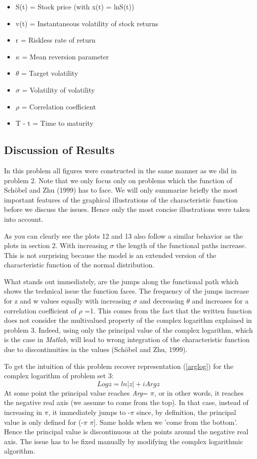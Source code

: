 \documentclass[a4paper,11pt]{article}
\begin{document}
\begin{itemize}
\item S(t) = Stock price (with x(t) = lnS(t))
\item v(t) = Instantaneous volatility of stock returns
\item r = Riskless rate of return
\item $\kappa$ =  Mean reversion parameter
\item $\theta$ = Target volatility
\item $\sigma$ = Volatility of volatility
\item $\rho$ = Correlation coefficient
\item T - t = Time to maturity
\end{itemize}
\subsection{Discussion of Results}
In this problem all figures were constructed in the same manner as we did in problem 2.
Note that we only focus only on problems which the function of Sch\"obel and Zhu (1999) has to face. We will only summarize briefly the most important features of the graphical illustrations of the characteristic function before we discuss the issues. Hence only the most concise illustrations were taken into account.

As you can clearly see the plots 12 and 13 also follow a similar behavior as the plots in section 2. With increasing $\sigma$ the length of the functional paths increase.  This is not surprising because the model is an extended version of the characteristic function of the normal distribution.

What stands out immediately, are the jumps along the functional path which shows the technical issue the function faces. The frequency of the jumps increase for z and w values equally with increasing $\sigma$ and decreasing $\theta$ and increases for a correlation coefficient of $\rho$ =1. This comes from the fact that the written function does not consider the multivalued property of the complex logarithm explained in problem 3. Indeed, using only the principal value of the complex logarithm, which is the case in \textit{Matlab}, will lead to wrong integration of the characteristic function due to discontinuities in the values (Sch\"obel and Zhu, 1999).

To get the intuition of this problem recover representation (\ref{arglog}) for the complex logarithm of problem set 3:
\begin{equation*}
Log z = ln|z| + i Arg z
\end{equation*}
At some point the principal value reaches \textit{Arg}= $\pi$, or in other words, it reaches the negative real axis (we assume to come from the top). In that case, instead of increasing in $\pi$, it immediately jumps to -$\pi$ since, by definition, the principal value is only defined for (-$\pi$ $\pi$]. Same holds when we 'come from the bottom'. Hence the principal value is discontinuous at the points around the negative real axis. The issue has to be fixed manually by modifying the complex logarithmic algorithm.
\end{document}
